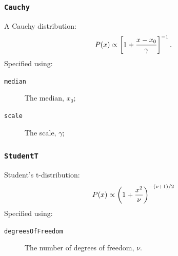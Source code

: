 \subsubsection{{\tt Cauchy}}

A Cauchy distribution:
\begin{equation}
P(x) \propto \left[1+{x-x_0\over\gamma}\right]^{-1}.
\end{equation}
Specified using:
\begin{description}
\item[{\tt median}] The median, $x_0$;
\item[{\tt scale}] The scale, $\gamma$;
\end{description}

\subsubsection{{\tt StudentT}}

Student's t-distribution:
\begin{equation}
P(x) \propto \left(1 + {x^2\over \nu}\right)^{-(\nu+1)/2}
\end{equation}
Specified using:
\begin{description}
\item[{\tt degreesOfFreedom}] The number of degrees of freedom, $\nu$.
\end{description}
